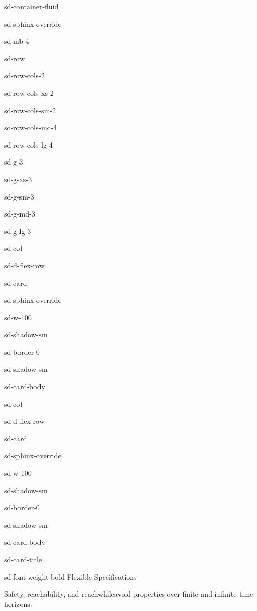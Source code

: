 \documentclass[a4paper,10pt,english]{sphinxmanual}
\begin{document}
\begin{sphinxuseclass}{sd-container-fluid}
\begin{sphinxuseclass}{sd-sphinx-override}
\begin{sphinxuseclass}{sd-mb-4}
\begin{sphinxuseclass}{sd-row}
\begin{sphinxuseclass}{sd-row-cols-2}
\begin{sphinxuseclass}{sd-row-cols-xs-2}
\begin{sphinxuseclass}{sd-row-cols-sm-2}
\begin{sphinxuseclass}{sd-row-cols-md-4}
\begin{sphinxuseclass}{sd-row-cols-lg-4}
\begin{sphinxuseclass}{sd-g-3}
\begin{sphinxuseclass}{sd-g-xs-3}
\begin{sphinxuseclass}{sd-g-sm-3}
\begin{sphinxuseclass}{sd-g-md-3}
\begin{sphinxuseclass}{sd-g-lg-3}
\begin{sphinxuseclass}{sd-col}
\begin{sphinxuseclass}{sd-d-flex-row}
\begin{sphinxuseclass}{sd-card}
\begin{sphinxuseclass}{sd-sphinx-override}
\begin{sphinxuseclass}{sd-w-100}
\begin{sphinxuseclass}{sd-shadow-sm}
\begin{sphinxuseclass}{sd-border-0}
\begin{sphinxuseclass}{sd-shadow-sm}
\begin{sphinxuseclass}{sd-card-body}
\end{sphinxuseclass}
\end{sphinxuseclass}
\end{sphinxuseclass}
\end{sphinxuseclass}
\end{sphinxuseclass}
\end{sphinxuseclass}
\end{sphinxuseclass}
\end{sphinxuseclass}
\end{sphinxuseclass}
\begin{sphinxuseclass}{sd-col}
\begin{sphinxuseclass}{sd-d-flex-row}
\begin{sphinxuseclass}{sd-card}
\begin{sphinxuseclass}{sd-sphinx-override}
\begin{sphinxuseclass}{sd-w-100}
\begin{sphinxuseclass}{sd-shadow-sm}
\begin{sphinxuseclass}{sd-border-0}
\begin{sphinxuseclass}{sd-shadow-sm}
\begin{sphinxuseclass}{sd-card-body}
\begin{sphinxuseclass}{sd-card-title}
\begin{sphinxuseclass}{sd-font-weight-bold} Flexible Specifications
\end{sphinxuseclass}
\end{sphinxuseclass}
\sphinxAtStartPar
Safety, reachability, and reach\sphinxhyphen{}while\sphinxhyphen{}avoid properties
over finite and infinite time horizons.


\end{sphinxuseclass}
\end{sphinxuseclass}
\end{sphinxuseclass}
\end{sphinxuseclass}
\end{sphinxuseclass}
\end{sphinxuseclass}
\end{sphinxuseclass}
\end{sphinxuseclass}
\end{sphinxuseclass}
\end{sphinxuseclass}
\end{sphinxuseclass}
\end{sphinxuseclass}
\end{sphinxuseclass}
\end{sphinxuseclass}
\end{sphinxuseclass}
\end{sphinxuseclass}
\end{sphinxuseclass}
\end{sphinxuseclass}
\end{sphinxuseclass}
\end{sphinxuseclass}
\end{sphinxuseclass}
\end{sphinxuseclass}
\end{sphinxuseclass}
\end{document}

